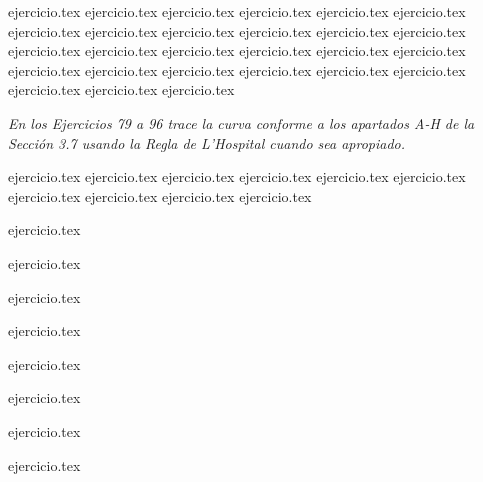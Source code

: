 \begin{enumerate}
\begin{minipage}{0.45\textwidth}
{ejercicio.tex}
{ejercicio.tex}
{ejercicio.tex}
{ejercicio.tex}
{ejercicio.tex}
{ejercicio.tex}
{ejercicio.tex}
{ejercicio.tex}
{ejercicio.tex}
{ejercicio.tex}
{ejercicio.tex}
{ejercicio.tex}
{ejercicio.tex}
{ejercicio.tex}
{ejercicio.tex}
{ejercicio.tex}
{ejercicio.tex}
{ejercicio.tex}
{ejercicio.tex}
{ejercicio.tex}
{ejercicio.tex}
{ejercicio.tex}
{ejercicio.tex}
{ejercicio.tex}
{ejercicio.tex}
{ejercicio.tex}
{ejercicio.tex}
\end{minipage}
\end{enumerate}

\vspace{1em}
\noindent \textit{En los Ejercicios 79 a 96 trace la curva conforme a los apartados A-H de la Sección 3.7 usando la Regla de L'Hospital cuando sea apropiado.}

\begin{enumerate}
    \setcounter{enumi}{78}
    \begin{minipage}{0.45\textwidth}
    {ejercicio.tex}
{ejercicio.tex}
{ejercicio.tex}
{ejercicio.tex}
{ejercicio.tex}
{ejercicio.tex}
{ejercicio.tex}
{ejercicio.tex}
{ejercicio.tex}
{ejercicio.tex}
\end{minipage}%
    \begin{minipage}{0.45\textwidth}
    \setcounter{enumi}{79}
    {ejercicio.tex}
\addtocounter{enumi}{1}
    {ejercicio.tex}
\addtocounter{enumi}{1}
    {ejercicio.tex}
\addtocounter{enumi}{1}
    {ejercicio.tex}
\addtocounter{enumi}{1}
    {ejercicio.tex}
\addtocounter{enumi}{1}
    {ejercicio.tex}
\addtocounter{enumi}{1}
    {ejercicio.tex}
\addtocounter{enumi}{1}
    {ejercicio.tex}
\end{minipage}
\end{enumerate}


